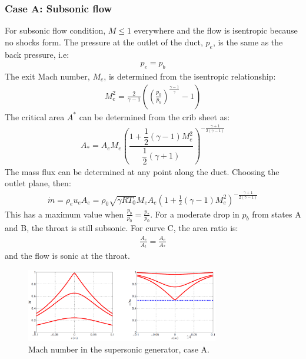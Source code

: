 \documentclass[class=report, crop=false, 12pt,a4paper]{standalone}
\begin{document}
\subsubsection{Case A: Subsonic flow}
For subsonic flow condition, $M \leq 1$ everywhere and the flow is isentropic because no shocks form. The pressure at the outlet of the duct, $p_e$, is the same as the back pressure, i.e:
\begin{gather}
    p_e = p_b
\end{gather}
The exit Mach number, $M_e$, is determined from the isentropic relationship:
\begin{gather}
    M_e^2 = \frac{2}{\gamma - 1}\left(\left(\frac{p_0}{p_b}\right)^{\frac{\gamma - 1}{\gamma}}-1\right)
\end{gather}
The critical area $A^*$ can be determined from the crib sheet as:
\begin{gather}
    A_* = A_e M_e \left(\dfrac{1 + \dfrac{1}{2}\left(\gamma - 1\right)M^2_e}{\dfrac{1}{2}\left(\gamma + 1\right)}\right)^{-\frac{\gamma + 1}{2\left(\gamma -1\right)}}
\end{gather}
The mass flux can be determined at any point along the duct. Choosing the outlet plane, then:
\begin{gather}
    \dot{m} = \rho_e u_e A_e = \rho_0 \sqrt{\gamma RT_0}M_e A_e \left(1 + \frac{1}{2}\left(\gamma - 1\right)M^2_e\right)^{-\frac{\gamma + 1}{2\left(\gamma - 1\right)}}
\end{gather}
This has a maximum value when $\frac{p_b}{p_0} = \frac{p_*}{p_0}$. For a moderate drop in $p_b$ from states A and B, the throat is still subsonic. For curve C, the area ratio is:
\begin{gather}
    \frac{A_e}{A_t} = \frac{A_e}{A_*}
\end{gather}
and the flow is sonic at the throat.
\begin{figure}[H]
    \centering
    \includegraphics[width = 0.75\textwidth]{../img/diagram57.png}
    \caption{Mach number in the supersonic generator, case A.}
\end{figure}
\end{document}
